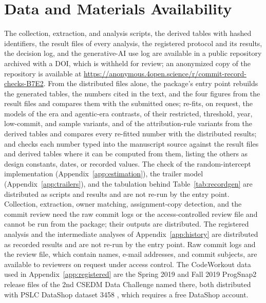 \documentclass[acmsmall,screen,review,anonymous]{acmart}
\begin{document}
\section*{Data and Materials Availability}
The collection, extraction, and analysis scripts, the derived tables with hashed identifiers, the result files of every analysis, the registered protocol and its results, the decision log, and the generative-AI use log are available in a public repository archived with a DOI, which is withheld for review; an anonymized copy of the repository is available at \url{https://anonymous.4open.science/r/commit-record-checks-B7E2}. From the distributed files alone, the package's entry point rebuilds the generated tables, the numbers cited in the text, and the four figures from the result files and compares them with the submitted ones; re-fits, on request, the models of the era and agentic-era contrasts, of their restricted, threshold, year, low-commit, and sample variants, and of the attribution-rule variants from the derived tables and compares every re-fitted number with the distributed results; and checks each number typed into the manuscript source against the result files and derived tables where it can be computed from them, listing the others as design constants, dates, or recorded values. The check of the random-intercept implementation (Appendix~\ref{app:estimation}), the trailer model (Appendix~\ref{app:trailers}), and the tabulation behind Table~\ref{tab:recordgen} are distributed as scripts and results and are not re-run by the entry point. Collection, extraction, owner matching, assignment-copy detection, and the commit review need the raw commit logs or the access-controlled review file and cannot be run from the package; their outputs are distributed. The registered analysis and the intermediate analyses of Appendix~\ref{app:history} are distributed as recorded results and are not re-run by the entry point. Raw commit logs and the review file, which contain names, e-mail addresses, and commit subjects, are available to reviewers on request under access control. The CodeWorkout data used in Appendix~\ref{app:registered} are the Spring 2019 and Fall 2019 ProgSnap2 release files of the 2nd CSEDM Data Challenge named there, both distributed with PSLC DataShop dataset 3458 \citep{codeworkout2020dataset}, which requires a free DataShop account.
\end{document}
